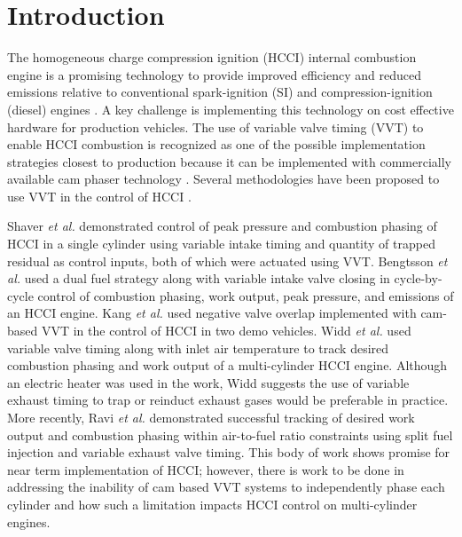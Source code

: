 \section{Introduction}
The homogeneous charge compression ignition (HCCI) internal combustion engine is a promising technology to provide improved efficiency and reduced emissions relative to conventional spark-ignition (SI) and compression-ignition (diesel) engines \cite{Epping2002, Stanglmaier1999}. A key challenge is implementing this technology on cost effective hardware for production vehicles. The use of variable valve timing (VVT) to enable HCCI combustion is recognized as one of the possible implementation strategies closest to production because it can be implemented with commercially available cam phaser technology \cite{Persson2005}. Several methodologies have been proposed to use VVT in the control of HCCI \cite{Shaver2005,Bengtsson2006,Kang2009,Widd2011,Ravi2012}.

Shaver \textit{et al.} \cite{Shaver2005} demonstrated control of peak pressure and combustion phasing of HCCI in a single cylinder using variable intake timing and quantity of trapped residual as control inputs, both of which were actuated using VVT. Bengtsson \textit{et al.} \cite{Bengtsson2006} used a dual fuel strategy along with variable intake valve closing in cycle-by-cycle control of combustion phasing, work output, peak pressure, and emissions of an HCCI engine. Kang \textit{et al.} \cite{Kang2009} used negative valve overlap implemented with cam-based VVT in the control of HCCI in two demo vehicles. Widd \textit{et al.} \cite{Widd2011} used variable valve timing along with inlet air temperature to track desired combustion phasing and work output of a multi-cylinder HCCI engine. Although an electric heater was used in the work, Widd suggests the use of variable exhaust timing to trap or reinduct exhaust gases would be preferable in practice. More recently, Ravi \textit{et al.} \cite{Ravi2012} demonstrated successful tracking of desired work output and combustion phasing within air-to-fuel ratio constraints using split fuel injection and variable exhaust valve timing. This body of work shows promise for near term implementation of HCCI; however, there is work to be done in addressing the inability of cam based VVT systems to independently phase each cylinder and how such a limitation impacts HCCI control on multi-cylinder engines.

